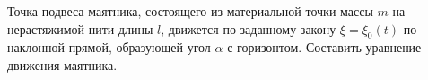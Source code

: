 Точка подвеса маятника, состоящего из материальной точки массы $m$ на нерастяжимой нити длины $l$, движется по заданному закону $\xi = \xi_0(t)$ по наклонной прямой, образующей угол $\alpha$ с горизонтом. Составить уравнение движения маятника.
